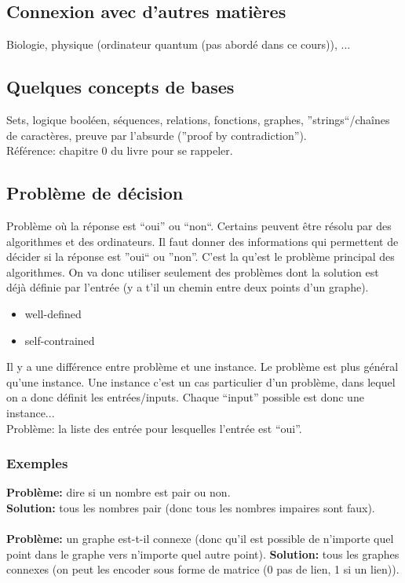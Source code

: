 \documentclass[a4paper,12pt]{article}
\begin{document}
  \subsection{Connexion avec d'autres matières}
    Biologie, physique (ordinateur quantum (pas abordé dans ce cours)), ...
    
  \subsection{Quelques concepts de bases}
    Sets, logique booléen, séquences, relations, fonctions, graphes, ''strings``/chaînes de caractères, preuve par l'absurde (''proof by contradiction'').\\
    Référence: chapitre 0 du livre pour se rappeler.
  
  \subsection{Problème de décision}
    Problème où la réponse est ``oui'' ou ``non``.  Certains peuvent être résolu par des algorithmes et des ordinateurs.  Il faut donner des informations qui permettent de décider si la réponse est ''oui`` ou ''non''.  C'est la qu'est le problème principal des algorithmes.  On va donc utiliser seulement des problèmes dont la solution est déjà définie par l'entrée (y a t'il un chemin entre deux points d'un graphe).\\
    \begin{itemize}
     \item well-defined
     \item self-contrained
    \end{itemize}
    Il y a une différence entre problème et une instance.  Le problème est plus général qu'une instance.  Une instance c'est un cas particulier d'un problème, dans lequel on a donc définit les entrées/inputs.  Chaque ``input'' possible est donc une instance...\\
    Problème: la liste des entrée pour lesquelles l'entrée est ``oui''.
    
    \subsubsection{Exemples}
      \textbf{Problème:} dire si un nombre est pair ou non.\\
      \textbf{Solution:} tous les nombres pair (donc tous les nombres impaires sont faux).\\
      \\
      \textbf{Problème:} un graphe est-t-il connexe (donc qu'il est possible de n'importe quel point dans le graphe vers n'importe quel autre point).
      \textbf{Solution:} tous les graphes connexes (on peut les encoder sous forme de matrice (0 pas de lien, 1 si un lien)).
      
\end{document}

